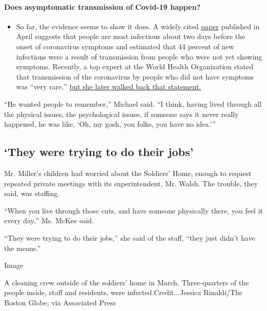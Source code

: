 \begin{itemize}
{  \paragraph{Does asymptomatic transmission of Covid-19
  happen?}\label{does-asymptomatic-transmission-of-covid-19-happen}}

  \begin{itemize}
  \tightlist
  \item
    So far, the evidence seems to show it does. A widely cited
    \href{https://www.nature.com/articles/s41591-020-0869-5}{paper}
    published in April suggests that people are most infectious about
    two days before the onset of coronavirus symptoms and estimated that
    44 percent of new infections were a result of transmission from
    people who were not yet showing symptoms. Recently, a top expert at
    the World Health Organization stated that transmission of the
    coronavirus by people who did not have symptoms was ``very rare,''
    \href{https://www.nytimes.com/2020/06/09/world/coronavirus-updates.html?action=click\&pgtype=Article\&state=default\&region=MAIN_CONTENT_3\&context=storylines_faq\#link-1f302e21}{but
    she later walked back that statement.}
  \end{itemize}
\end{itemize}

``He wanted people to remember,'' Michael said. ``I think, having lived
through all the physical issues, the psychological issues, if someone
says it never really happened, he was like, `Oh, my gosh, you folks, you
have no idea.'''

\hypertarget{they-were-trying-to-do-their-jobs}{%
\subsection{`They were trying to do their
jobs'}\label{they-were-trying-to-do-their-jobs}}

Mr. Miller's children had worried about the Soldiers' Home, enough to
request repeated private meetings with its superintendent, Mr. Walsh.
The trouble, they said, was staffing.

``When you live through those cuts, and have someone physically there,
you feel it every day,'' Ms. McKee said.

``They were trying to do their jobs,'' she said of the staff, ``they
just didn't have the means.''

Image

A cleaning crew outside of the soldiers' home in March. Three-quarters
of the people inside, staff and residents, were
infected.Credit...Jessica Rinaldi/The Boston Globe, via Associated Press

